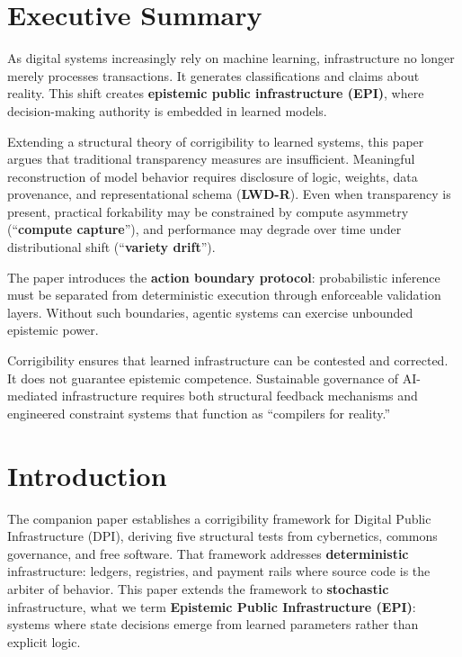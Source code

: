 \documentclass[11pt,a4paper]{article}
\theoremstyle{definition}
\begin{document}
\section*{Executive Summary}

As digital systems increasingly rely on machine learning, infrastructure no longer merely processes transactions. It generates classifications and claims about reality. This shift creates \textbf{epistemic public infrastructure (EPI)}, where decision-making authority is embedded in learned models.

Extending a structural theory of corrigibility to learned systems, this paper argues that traditional transparency measures are insufficient. Meaningful reconstruction of model behavior requires disclosure of logic, weights, data provenance, and representational schema (\textbf{LWD-R}). Even when transparency is present, practical forkability may be constrained by compute asymmetry (``\textbf{compute capture}''), and performance may degrade over time under distributional shift (``\textbf{variety drift}'').

The paper introduces the \textbf{action boundary protocol}: probabilistic inference must be separated from deterministic execution through enforceable validation layers. Without such boundaries, agentic systems can exercise unbounded epistemic power.

Corrigibility ensures that learned infrastructure can be contested and corrected. It does not guarantee epistemic competence. Sustainable governance of AI-mediated infrastructure requires both structural feedback mechanisms and engineered constraint systems that function as ``compilers for reality.''

\section{Introduction}
\label{sec:intro}

The companion paper \citep{paper1} establishes a corrigibility framework for Digital Public Infrastructure (DPI), deriving five structural tests from cybernetics, commons governance, and free software. That framework addresses \textbf{deterministic} infrastructure: ledgers, registries, and payment rails where source code is the arbiter of behavior. This paper extends the framework to \textbf{stochastic} infrastructure, what we term \textbf{Epistemic Public Infrastructure (EPI)}: systems where state decisions emerge from learned parameters rather than explicit logic.
\end{document}
